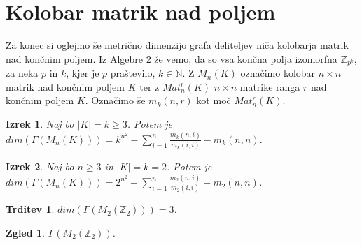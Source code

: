 \documentclass[a4paper,12pt]{article}
\def\N{\mathbb{N}} %
\def\Z{\mathbb{Z}} %
\newtheorem{izrek}{Izrek}
\newtheorem{trditev}{Trditev}
\newtheorem{zgled}{Zgled}
\begin{document}
\section{Kolobar matrik nad poljem}
Za konec si oglejmo še metrično dimenzijo grafa deliteljev niča kolobarja matrik nad 
končnim poljem. Iz Algebre 2 že vemo, da so vsa končna polja izomorfna $\Z_{p^k}$, 
za neka $p$ in $k$, kjer je $p$ praštevilo, $k \in \N$. Z 
$M_n(K)$ označimo kolobar $n \times n$ matrik nad končnim poljem $K$ ter z $Mat_n^r(K)$ 
$n \times n$ matrike ranga $r$ nad končnim poljem $K$. Označimo še $m_k(n,r)$ kot 
moč $Mat_n^r(K)$.
%
\begin{izrek}
    Naj bo $|K| = k \geq 3$. Potem je \\
    $dim(\Gamma(M_n(K))) = k^{n^2} - \sum_{i=1}^{n}\frac{m_k(n,i)}{m_k(i,i)} - m_k(n,n)$.
\end{izrek}
%
\begin{izrek}
    Naj bo $n \geq 3$ in $|K| = k = 2$. Potem je \\
    $dim(\Gamma(M_n(K))) = 2^{n^2} - \sum_{i=1}^{n}\frac{m_2(n,i)}{m_2(i,i)} - m_2(n,n)$.
\end{izrek}
%
\begin{trditev}
    $dim(\Gamma(M_2(\Z_2))) = 3$.
\end{trditev}
%
\begin{zgled}
    $\Gamma(M_2(\Z_2))$.
\end{zgled}
%
\end{document}
